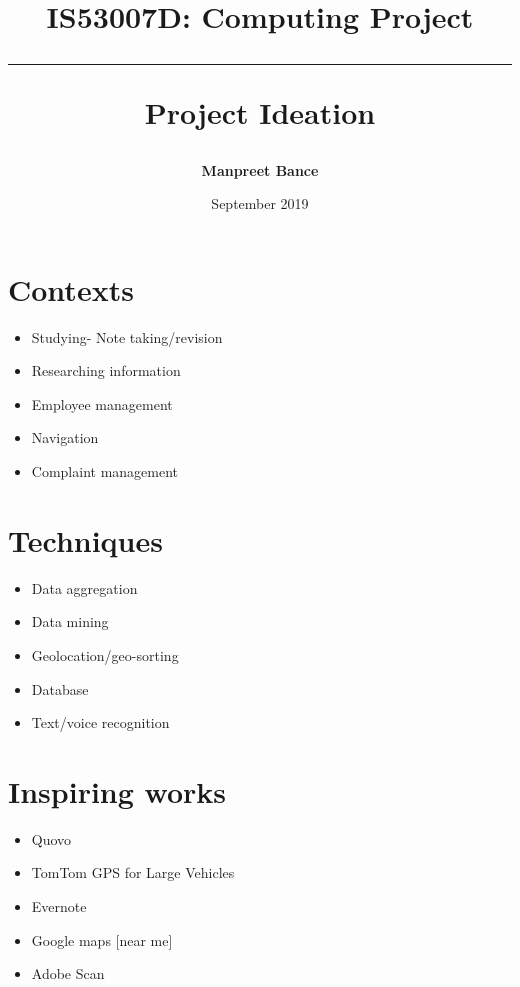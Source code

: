\documentclass{report}
\title{\textbf{IS53007D: Computing Project} \vspace{0.5cm} \hrule \vspace{0.5cm} Project Ideation}
\date{September 2019}
\author{\textbf{Manpreet Bance}}
\begin{document}
\maketitle


\section{Contexts}
\begin{itemize}
	\item Studying- Note taking/revision
	\item Researching information
	\item Employee management
	\item Navigation
	\item Complaint management
\end{itemize}

\section{Techniques}
\begin{itemize}
	\item Data aggregation
	\item Data mining
	\item Geolocation/geo-sorting
	\item Database
	\item Text/voice recognition
\end{itemize}

\section{Inspiring works}
\begin{itemize}
	\item Quovo
	\item TomTom GPS for Large Vehicles
	\item Evernote
	\item Google maps [near me]
	\item Adobe Scan
\end{itemize}
\end{document}
